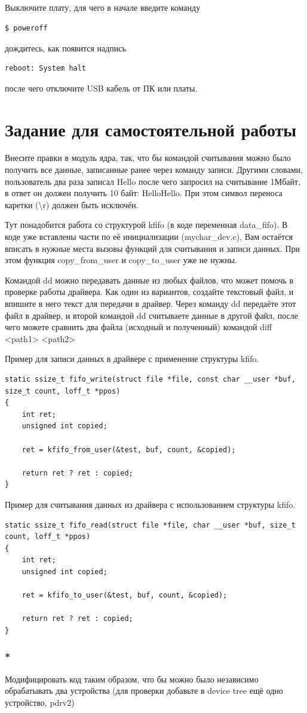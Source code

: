 \subsection{} Выключите плату, для чего в начале введите команду
\begin{lstlisting}[style=bash]
	$ poweroff
\end{lstlisting}
дождитесь, как появится надпись
\begin{lstlisting}[style=stdout]
	reboot: System halt
\end{lstlisting}
после чего отключите USB кабель от ПК или платы.  

\section{Задание для самостоятельной работы}
Внесите правки в модуль ядра, так, что бы командой считывания можно было получить все данные, записанные ранее через команду записи. Другими словами, пользователь два раза записал Hello после чего запросил на считывание 1Мбайт, в ответ он должен получить 10 байт: HelloHello. При этом символ переноса каретки (\textbackslash{}r) должен быть исключён.

Тут понадобится работа со структурой kfifo (в коде переменная data\_fifo). В коде уже вставлены части по её инициализации (mychar\_dev.c), Вам остаётся вписать в нужные места вызовы функций для считывания и записи данных. При этом функция copy\_from\_user и copy\_to\_user уже не нужны.

Командой dd можно передавать данные из любых файлов, что может помочь в проверке работы драйвера. Как один из вариантов, создайте текстовый файл, и впишите в него текст для передачи в драйвер. Через команду dd передаёте этот файл в драйвер, и второй командой dd считываете данные в другой файл, после чего можете сравнить два файла (исходный и полученный) командой diff <path1> <path2>

Пример для записи данных в драйвере с применение структуры kfifo.
\begin{lstlisting}[style=stdout]
static ssize_t fifo_write(struct file *file, const char __user *buf, size_t count, loff_t *ppos)
{
	int ret;
	unsigned int copied;
	
	ret = kfifo_from_user(&test, buf, count, &copied);
	
	return ret ? ret : copied;
}
\end{lstlisting}


Пример для считывания данных из драйвера с использованием структуры kfifo.
\begin{lstlisting}[style=stdout]
static ssize_t fifo_read(struct file *file, char __user *buf, size_t count, loff_t *ppos)
{
	int ret;
	unsigned int copied;
	
	ret = kfifo_to_user(&test, buf, count, &copied);
	
	return ret ? ret : copied;
}
\end{lstlisting}

\subsubsection{*} Модифицировать код таким образом, что бы  можно было независимо обрабатывать два устройства (для проверки добавьте в device tree ещё одно устройство, pdrv2)
